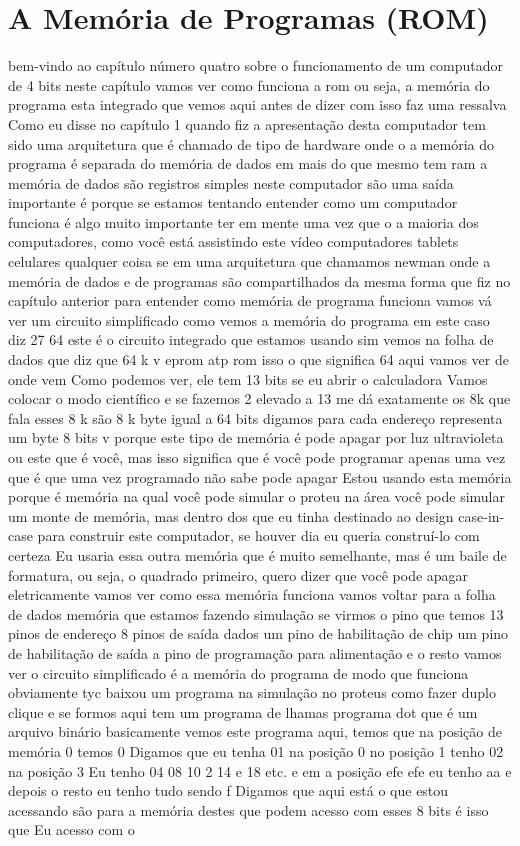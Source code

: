 \documentclass[oneside,11pt]{memoir} %
\begin{document}
\chapter{A Memória de Programas (ROM)}
bem-vindo ao capítulo número quatro  sobre o funcionamento de um  computador de 4 bits neste capítulo  vamos ver como funciona a rom  ou seja, a memória do programa esta  integrado que vemos aqui antes de dizer com  isso faz uma ressalva  Como eu disse no capítulo  1 quando fiz a apresentação desta  computador tem sido uma arquitetura que  é chamado de tipo de hardware onde o  a memória do programa é separada do  memória de dados em mais do que mesmo  tem ram a memória de dados são  registros simples neste computador são  uma saída importante é porque se  estamos tentando entender como  um computador funciona é algo muito  importante ter em mente uma vez que o  a maioria dos computadores, como  você está assistindo este vídeo  computadores tablets celulares qualquer coisa  se em uma arquitetura que chamamos  newman onde a memória de dados e de  programas são compartilhados  da mesma forma que fiz no  capítulo anterior para entender como  memória de programa funciona vamos  vá ver um circuito simplificado  como vemos a memória do programa em  este caso diz 27 64 este é o circuito  integrado que estamos usando sim  vemos na folha de dados que diz que 64 k  v eprom atp rom isso o que significa 64  aqui vamos ver de onde vem  Como podemos ver, ele tem 13 bits se eu abrir o  calculadora  Vamos colocar o modo científico e se  fazemos 2 elevado a 13  me dá exatamente os 8k que fala  esses 8 k são 8 k byte igual a 64  bits digamos para cada endereço  representa um byte 8 bits  v porque este tipo de memória é  pode apagar por luz ultravioleta ou este  que é você, mas isso significa que é  você pode programar apenas uma vez que é  que uma vez programado não sabe  pode apagar  Estou usando esta memória porque é  memória na qual você pode simular o  proteu  na área você pode simular um monte de  memória, mas dentro dos que eu tinha  destinado ao design case-in-case  para construir este computador, se houver  dia eu queria construí-lo com certeza  Eu usaria essa outra memória que é muito  semelhante, mas é um baile de formatura, ou seja, o  quadrado primeiro, quero dizer que você pode  apagar eletricamente  vamos ver como essa memória funciona  vamos voltar para a folha de dados  memória que estamos fazendo  simulação se virmos o pino que temos  13 pinos de endereço 8 pinos de saída  dados um pino de habilitação de chip  um pino de habilitação de saída a  pino de programação para alimentação e  o resto vamos ver o circuito  simplificado  é a memória do programa de modo que  funciona obviamente tyc baixou um  programa na simulação no proteus  como fazer duplo clique  e se formos aqui tem um programa de lhamas  programa dot que é um arquivo binário  basicamente  vemos este programa aqui, temos que  na posição de memória 0 temos 0  Digamos que eu tenha 01 na posição 0 no  posição 1 tenho 02 na posição 3  Eu tenho 04 08 10 2 14 e 18 etc. e em  a posição  efe efe eu tenho aa e depois o resto  eu tenho tudo sendo f  Digamos que aqui está o que estou acessando  são para a memória destes que podem  acesso com esses 8 bits é isso que  Eu acesso com o 
\end{document}
